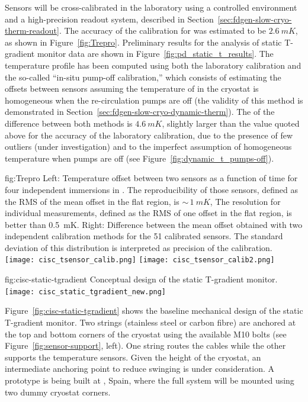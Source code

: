 Sensors will be cross-calibrated in the laboratory using a controlled environment and a high-precision readout system, described in Section~\ref{sec:fdgen-slow-cryo-therm-readout}.
The accuracy of the calibration for  was estimated to be $\SI{2.6}{mK}$, as shown in Figure~\ref{fig:Trepro}. Preliminary results for the analysis of  static T-gradient monitor data are shown in Figure~\ref{fig:pd_static_t_results}. The temperature profile has been computed using both the laboratory calibration and the so-called ``in-situ pump-off calibration,'' which consists %
of estimating the offsets between sensors assuming the temperature of  in the cryostat is homogeneous when the re-circulation pumps are off (the validity of this method is demonstrated in Section~\ref{sec:fdgen-slow-cryo-dynamic-therm}).  
The  of the difference between both methods is $\SI{4.6}{mK}$, slightly larger than the value quoted above for the accuracy of the laboratory calibration, due to the presence of few outliers (under investigation) and to the imperfect assumption of homogeneous temperature when pumps are off (see Figure~\ref{fig:dynamic_t_pumps-off}).  


\begin{dunefigure}{fig:Trepro}{
 Left:   Temperature offset between two sensors as a function of time for four independent immersions in . The reproducibility of those sensors, defined as the RMS of the mean offset in the flat region, is $\sim\,\SI{1}{mK}$,
    The resolution for individual measurements, defined as the RMS of one offset in the flat region, is better than \SI{0.5}{mK}. Right: Difference between the mean offset obtained with two independent calibration methods for the 51 calibrated sensors. The standard deviation of this distribution is interpreted as precision of the calibration.}
  \texttt{[image: cisc\_tsensor\_calib.png]}%
  \texttt{[image: cisc\_tsensor\_calib2.png]}%
\end{dunefigure}


\begin{dunefigure}
{fig:cisc-static-tgradient}
  {Conceptual design of the static T-gradient monitor.}
  \texttt{[image: cisc\_static\_tgradient\_new.png]}
\end{dunefigure}

Figure~\ref{fig:cisc-static-tgradient} shows the baseline mechanical design of
the static T-gradient monitor. Two strings (stainless steel or carbon fibre) are anchored at the top and bottom corners of the cryostat using the available M10 bolts (see Figure~\ref{fig:sensor-support}, left). One string routes the cables while the other supports the temperature sensors.
Given the height of the cryostat, an intermediate anchoring point to reduce swinging is under consideration. 
A prototype is being built at , Spain, where the full system will be mounted using two dummy cryostat corners.   


